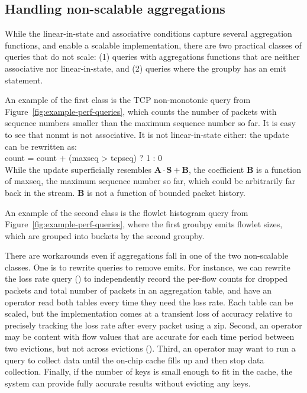 \subsection{Handling non-scalable aggregations}
\label{sec:workaround-nonscalable}
While the linear-in-state and associative conditions capture several aggregation
functions, and enable a scalable implementation, there are two practical classes
of queries that do not scale: (1) queries with aggregations
functions that are neither associative nor linear-in-state, and (2) queries where
the groupby has an {\ct emit} statement.

An example of the first class is the TCP non-monotonic query from
Figure~\ref{fig:example-perf-queries}, which counts the number of packets
with sequence numbers smaller than the maximum sequence number so far. It is
easy to see that {\ct nonmt} is not associative. It is not linear-in-state
either: the update can be rewritten as:
\\
%
{\ct count = count + (maxseq > tcpseq) ? 1 : 0}\\
%
While the update superficially resembles $\boldsymbol{A}
\cdot \boldsymbol{S} + \boldsymbol{B}$, the coefficient $\boldsymbol{B}$ is a
function of {\ct maxseq}, \ie the maximum sequence number so far, which
could be arbitrarily far back in the stream.
$\boldsymbol{B}$ is not a function of bounded packet history.

An example of the second class is the flowlet histogram query from
Figure~\ref{fig:example-perf-queries}, where the first {\ct groubpy} emits
flowlet sizes, which are grouped into buckets by the second {\ct groupby}.

There are workarounds even if aggregations fall in one of the two
non-scalable classes. One is to 
rewrite queries to remove {\ct emit}s.
For instance, we can rewrite the loss rate query
() to independently record the per-flow
counts for dropped packets and total number of packets in an aggregation table, and
have an operator read both tables every time they need the loss rate. Each
table can be scaled,
but the implementation comes at a transient loss of accuracy
relative to precisely 
tracking the loss rate after every packet using a {\ct zip.}  Second, an
operator may be content
with flow values that are accurate for each time period between two evictions,
but not across evictions (). Third, an operator
may want to run a query to collect data until the on-chip cache fills up and
then stop data collection. Finally, if the number of keys is small enough to fit
in the cache, the system can provide fully accurate results without evicting any
keys.

